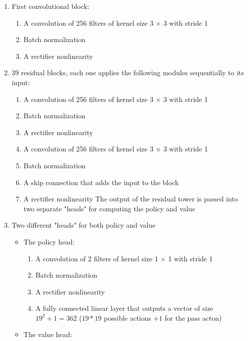 \documentclass{article}
\begin{document}
\begin{enumerate}
	\item First convolutional block:
	\begin{enumerate}
		\item A convolution of 256 filters of kernel size 3 $\times$ 3 with stride 1
		\item Batch normalization
		\item A rectifier nonlinearity
	\end{enumerate}
	\item  39 residual blocks, each one applies the following modules sequentially to its input:
	\begin{enumerate}
		\item A convolution of 256 filters of kernel size 3 $\times$ 3 with stride 1
		\item Batch normalization
		\item A rectifier nonlinearity
		\item A convolution of 256 filters of kernel size 3 $\times$ 3 with stride 1
		\item Batch normalization
		\item A skip connection that adds the input to the block
		\item A rectifier nonlinearity
		The output of the residual tower is passed into two separate "heads" for computing the policy and value
	\end{enumerate}
	\item Two different "heads" for both policy and value
	\begin{itemize}
		\item The policy head:
		
		\begin{enumerate}
			\item A convolution of 2 filters of kernel size 1 $\times$ 1 with stride 1
			\item Batch normalization
			\item A rectifier nonlinearity
			\item A fully connected linear layer that outputs a vector of size $19^2 + 1 = 362$ ($19*19$ possible actions $+1$ for the pass acton)
		\end{enumerate}
		
		\item The value head:
		

\end{itemize}
\end{enumerate}
\end{document}
